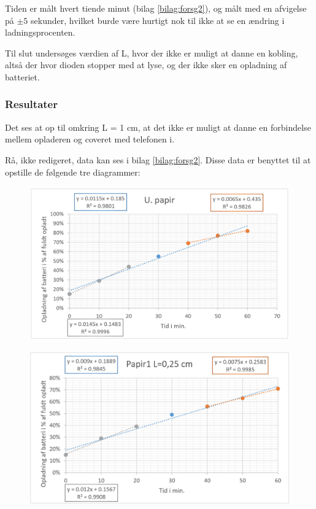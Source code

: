 Tiden er målt hvert tiende minut (bilag \ref{bilag:forsg2}), og målt med en afvigelse på $\pm 5$ sekunder, hvilket burde være hurtigt nok til ikke at se en ændring i ladningsprocenten.

Til slut undersøges værdien af L, hvor der ikke er muligt at danne en kobling, altså der hvor dioden stopper med at lyse, og der ikke sker en opladning af batteriet.

\subsubsection{Resultater}
Det ses at op til omkring L = 1 cm, at det ikke er muligt at danne en forbindelse mellem opladeren og coveret med telefonen i.

Rå, ikke redigeret, data kan ses i bilag \ref{bilag:forsg2}. Disse data er benyttet til at opstille de følgende tre diagrammer:

\begin{figure}[H]
\centering
\includegraphics[width=1\textwidth]{Setup/forsg2_graf1}
\caption{}
\label{figure:graf1}
\end{figure}

\begin{figure}[H]
\centering
\includegraphics[width=1\textwidth]{Setup/forsg2_graf22}
\caption{}
\label{figure:graf2}
\end{figure}

